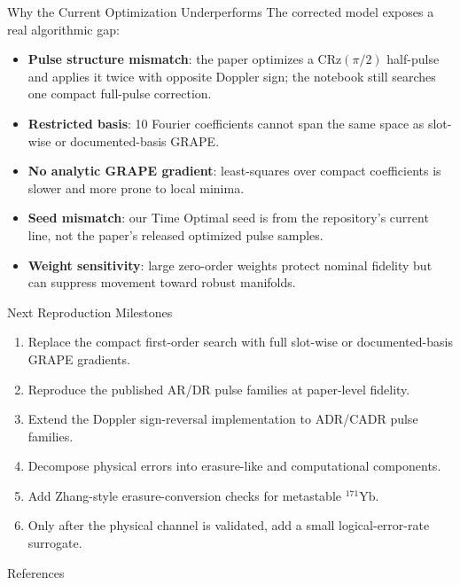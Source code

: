 \documentclass[aspectratio=169]{beamer}
\begin{document}
\begin{frame}{Why the Current Optimization Underperforms}
  The corrected model exposes a real algorithmic gap:
  \begin{itemize}
    \item \textbf{Pulse structure mismatch}: the paper optimizes a CRz\((\pi/2)\) half-pulse and applies it twice with opposite Doppler sign; the notebook still searches one compact full-pulse correction.
    \item \textbf{Restricted basis}: 10 Fourier coefficients cannot span the same space as slot-wise or documented-basis GRAPE.
    \item \textbf{No analytic GRAPE gradient}: least-squares over compact coefficients is slower and more prone to local minima.
    \item \textbf{Seed mismatch}: our Time Optimal seed is from the repository's current line, not the paper's released optimized pulse samples.
    \item \textbf{Weight sensitivity}: large zero-order weights protect nominal fidelity but can suppress movement toward robust manifolds.
  \end{itemize}
\end{frame}

\begin{frame}{Next Reproduction Milestones}
  \begin{enumerate}
    \item Replace the compact first-order search with full slot-wise or documented-basis GRAPE gradients.
    \item Reproduce the published AR/DR pulse families at paper-level fidelity.
    \item Extend the Doppler sign-reversal implementation to ADR/CADR pulse families.
    \item Decompose physical errors into erasure-like and computational components.
    \item Add Zhang-style erasure-conversion checks for metastable \(^{171}\mathrm{Yb}\).
    \item Only after the physical channel is validated, add a small logical-error-rate surrogate.
  \end{enumerate}
\end{frame}

\begin{frame}[allowframebreaks]{References}
  \printbibliography
\end{frame}
\end{document}
